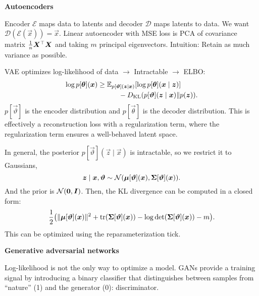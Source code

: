 \documentclass[10pt]{article}
\newenvironment{topic}[1]
{\textbf{\sffamily \colorbox{black}{\rlap{\textbf{\textcolor{white}{#1}}}\hspace{\linewidth}\hspace{-2\fboxsep}}}}
{}
\newenvironment{subtopic}[1]
{\begin{center}\textbf{\sffamily #1}\end{center}}
{}
\begin{document}
\begin{multicols*}{3}
\begin{topic}{Statistical learning theory}
    \end{topic}

    \begin{topic}{Generative models}

        \begin{subtopic}{Autoencoders}
            Encoder $\bm{\mathcal{E}}$ maps data to latents and decoder $\bm{\mathcal{D}}$ maps
            latents to data. We want $\bm{\mathcal{D}}(\bm{\mathcal{E}}(\vec{x})) = \vec{x}$. Linear
            autoencoder with MSE loss is PCA of covariance matrix $\frac{1}{n} \bm{X}^\top
                \bm{X}$ and taking $m$ principal eigenvectors. Intuition: Retain as much variance as possible.

            VAE optimizes log-likelihood of data $\to$ Intractable $\to$ ELBO:
            \begin{align*}
                \log p[\bm{\theta}](\bm{x}) & \geq \mathbb{E}_{p[\bm{\vartheta}](\bm{z} \mid \bm{x})} [\log p[\bm{\theta}](\bm{x} \mid \bm{z})] \\
                & \quad \quad \quad - D_{\mathrm{KL}}(p[\bm{\vartheta}](\bm{z} \mid \bm{x}) \| p(\bm{z})).
            \end{align*}
            $p[\vec{\vartheta}]$ is the encoder distribution and $p[\vec{\theta}]$ is the decoder
            distribution. This is effectively a reconstruction loss with a regularization term, where
            the regularization term ensures a well-behaved latent space.

            In general, the posterior $p[\vec{\vartheta}](\vec{z} \mid \vec{x})$ is intractable, so we restrict
            it to Gaussians, \[
                \bm{z} \mid \bm{x}, \bm{\vartheta} \sim \mathcal{N}(\bm{\mu}[\bm{\vartheta}](\bm{x}), \bm{\Sigma}[\bm{\vartheta}](\bm{x})).
            \]
            And the prior is $\mathcal{N}(\bm{0}, \bm{I})$. Then, the KL divergence can be computed in a
            closed form: \[
                \frac{1}{2} \lft( \| \vec{\mu}[\vec{\vartheta}](\vec{x}) \|^2 + \tr{\mat{\Sigma}[\vec{\vartheta}](\vec{x})} - \log \det{\mat{\Sigma}[\vec{\vartheta}](\vec{x})} - m \rgt).
            \]
            This can be optimized using the reparameterization tick.
        \end{subtopic}

        \begin{subtopic}{Generative adversarial networks}
            Log-likelihood is not the only way to optimize a model. GANs provide a training signal by
            introducing a binary classifier that distinguishes between samples from ``nature'' (1) and the
            generator (0): discriminator.


\end{subtopic}
\end{topic}
\end{multicols*}
\end{document}
